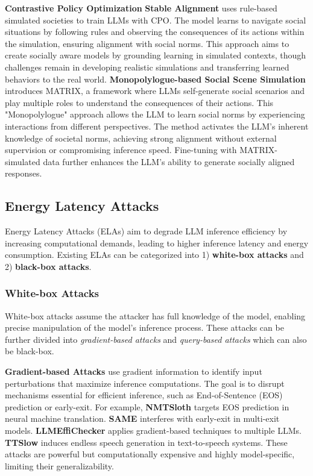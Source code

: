 \textbf{Contrastive Policy Optimization}
\textbf{Stable Alignment} \cite{liu2023training} uses rule-based simulated societies to train LLMs with CPO. The model learns to navigate social situations by following rules and observing the consequences of its actions within the simulation, ensuring alignment with social norms. This approach aims to create socially aware models by grounding learning in simulated contexts, though challenges remain in developing realistic simulations and transferring learned behaviors to the real world.
\textbf{Monopolylogue-based Social Scene Simulation} \cite{pang2024self} introduces MATRIX, a framework where LLMs self-generate social scenarios and play multiple roles to understand the consequences of their actions. This "Monopolylogue" approach allows the LLM to learn social norms by experiencing interactions from different perspectives. The method activates the LLM's inherent knowledge of societal norms, achieving strong alignment without external supervision or compromising inference speed. Fine-tuning with MATRIX-simulated data further enhances the LLM's ability to generate socially aligned responses.

\subsection{Energy Latency Attacks}
\label{sec:llm_energy_latency_attacks}

Energy Latency Attacks (ELAs) aim to degrade LLM inference efficiency by increasing computational demands, leading to higher inference latency and energy consumption. Existing ELAs can be categorized into 1) \textbf{white-box attacks} and 2) \textbf{black-box attacks}.

\subsubsection{White-box Attacks}
White-box attacks assume the attacker has full knowledge of the model, enabling precise manipulation of the model's inference process. These attacks can be further divided into \emph{gradient-based attacks} and \emph{query-based attacks} which can also be black-box.

\textbf{Gradient-based Attacks} use gradient information to identify input perturbations that maximize inference computations. The goal is to disrupt mechanisms essential for efficient inference, such as End-of-Sentence (EOS) prediction or early-exit. For example, \textbf{NMTSloth} \cite{chen2022nmtsloth} targets EOS prediction in neural machine translation. \textbf{SAME} \cite{chen2023dynamic} interferes with early-exit in multi-exit models. \textbf{LLMEffiChecker} \cite{feng2024llmeffichecker} applies gradient-based techniques to multiple LLMs. 
\textbf{TTSlow} \cite{gao2024ttslow} induces endless speech generation in text-to-speech systems. These attacks are powerful but computationally expensive and highly model-specific, limiting their generalizability.

